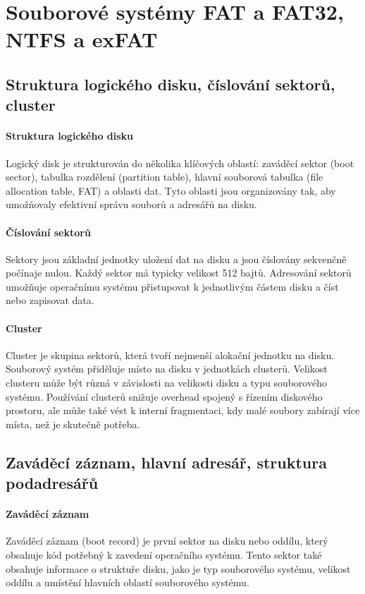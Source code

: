 \section{Souborové systémy FAT a FAT32, NTFS a exFAT}
\subsection{Struktura logického disku, číslování sektorů, cluster}
\paragraph{Struktura logického disku}
Logický disk je strukturován do několika klíčových oblastí: zaváděcí sektor (boot sector), tabulka rozdělení (partition table), hlavní souborová tabulka (file allocation table, FAT) a oblasti dat. Tyto oblasti jsou organizovány tak, aby umožňovaly efektivní správu souborů a adresářů na disku.

\paragraph{Číslování sektorů}
Sektory jsou základní jednotky uložení dat na disku a jsou číslovány sekvenčně počínaje nulou. Každý sektor má typicky velikost 512 bajtů. Adresování sektorů umožňuje operačnímu systému přistupovat k jednotlivým částem disku a číst nebo zapisovat data.

\paragraph{Cluster}
Cluster je skupina sektorů, která tvoří nejmenší alokační jednotku na disku. Souborový systém přiděluje místo na disku v jednotkách clusterů. Velikost clusteru může být různá v závislosti na velikosti disku a typu souborového systému. Používání clusterů snižuje overhead spojený s řízením diskového prostoru, ale může také vést k interní fragmentaci, kdy malé soubory zabírají více místa, než je skutečně potřeba.

\subsection{Zaváděcí záznam, hlavní adresář, struktura podadresářů}
\paragraph{Zaváděcí záznam}
Zaváděcí záznam (boot record) je první sektor na disku nebo oddílu, který obsahuje kód potřebný k zavedení operačního systému. Tento sektor také obsahuje informace o struktuře disku, jako je typ souborového systému, velikost oddílu a umístění hlavních oblastí souborového systému.

